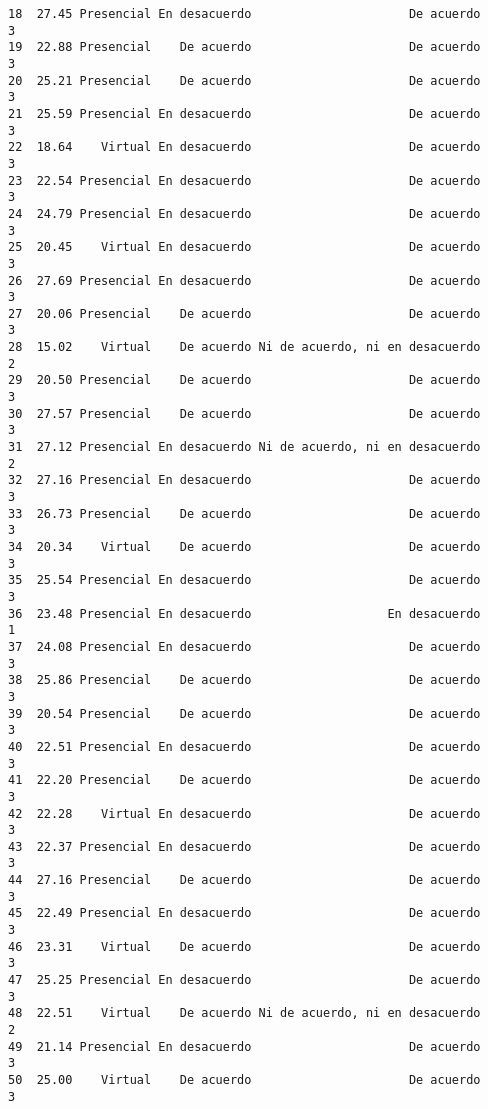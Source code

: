 \documentclass[
  letterpaper,
  DIV=11,
  numbers=noendperiod]{scrartcl}
\begin{document}
\begin{verbatim}
18  27.45 Presencial En desacuerdo                      De acuerdo           3
19  22.88 Presencial    De acuerdo                      De acuerdo           3
20  25.21 Presencial    De acuerdo                      De acuerdo           3
21  25.59 Presencial En desacuerdo                      De acuerdo           3
22  18.64    Virtual En desacuerdo                      De acuerdo           3
23  22.54 Presencial En desacuerdo                      De acuerdo           3
24  24.79 Presencial En desacuerdo                      De acuerdo           3
25  20.45    Virtual En desacuerdo                      De acuerdo           3
26  27.69 Presencial En desacuerdo                      De acuerdo           3
27  20.06 Presencial    De acuerdo                      De acuerdo           3
28  15.02    Virtual    De acuerdo Ni de acuerdo, ni en desacuerdo           2
29  20.50 Presencial    De acuerdo                      De acuerdo           3
30  27.57 Presencial    De acuerdo                      De acuerdo           3
31  27.12 Presencial En desacuerdo Ni de acuerdo, ni en desacuerdo           2
32  27.16 Presencial En desacuerdo                      De acuerdo           3
33  26.73 Presencial    De acuerdo                      De acuerdo           3
34  20.34    Virtual    De acuerdo                      De acuerdo           3
35  25.54 Presencial En desacuerdo                      De acuerdo           3
36  23.48 Presencial En desacuerdo                   En desacuerdo           1
37  24.08 Presencial En desacuerdo                      De acuerdo           3
38  25.86 Presencial    De acuerdo                      De acuerdo           3
39  20.54 Presencial    De acuerdo                      De acuerdo           3
40  22.51 Presencial En desacuerdo                      De acuerdo           3
41  22.20 Presencial    De acuerdo                      De acuerdo           3
42  22.28    Virtual En desacuerdo                      De acuerdo           3
43  22.37 Presencial En desacuerdo                      De acuerdo           3
44  27.16 Presencial    De acuerdo                      De acuerdo           3
45  22.49 Presencial En desacuerdo                      De acuerdo           3
46  23.31    Virtual    De acuerdo                      De acuerdo           3
47  25.25 Presencial En desacuerdo                      De acuerdo           3
48  22.51    Virtual    De acuerdo Ni de acuerdo, ni en desacuerdo           2
49  21.14 Presencial En desacuerdo                      De acuerdo           3
50  25.00    Virtual    De acuerdo                      De acuerdo           3

\end{verbatim}
\end{document}
